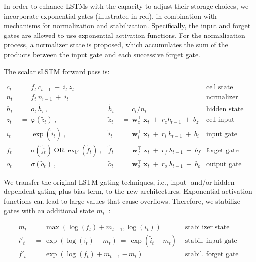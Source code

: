 In order to enhance LSTMs with the capacity to adjust their storage choices, we incorporate exponential gates (illustrated in red), in combination with mechanisms for normalization and stabilization. Specifically, the input and forget gates are allowed to use exponential activation functions. For the normalization process, a normalizer state is proposed, which accumulates the sum of the products between the input gate and each successive forget gate.

The scalar sLSTM forward pass is:

\begin{align}
\label{eq:slstmforward}
c_t \ &= \  f_t \ c_{t-1} \ + \ i_t \ z_t & & 
 &\text{cell state} \\
n_t \ &= \  f_t \ n_{t-1} \ + \ i_t  & & 
 &\text{normalizer state} \\
h_t \ &= \ o_t \ \tilde{h}_t \ ,
  &\tilde{h}_t \ &= \ c_t / n_t
&\text{hidden state} \\
z_t \ &= \ \varphi \left( \tilde{z}_t \right) \ , 
  &\tilde{z}_t \ &=  \ \mathbf{w}^\top_{z} \ \mathbf{x}_t \ + \
  r_{z}  h_{t-1} \ + \  b_{z}
  &\text{cell input} \\
i_t \ &= \ \!\exp \left( \tilde{i}_t  \right) \ , 
  &\tilde{i}_t \ &= \ \mathbf{w}^\top_{i} \ \mathbf{x}_t \ + \
  r_{i}  \ h_{t-1} \ + \  b_{i}
  &\text{input gate} \\
f_t \ &= \ \sigma \left(  \tilde{f}_t \right) \ \text{OR} \
\!\exp \left(  \tilde{f}_t \right) \ ,
  &\tilde{f}_t \ &= \ \mathbf{w}^\top_{f} \ \mathbf{x}_t  \ + \
  r_{f}  \ h_{t-1} \ + \  b_{f}
  &\text{forget gate} \\
o_t \ &= \ \sigma \left( \tilde{o}_t \right) \ , 
  &\tilde{o}_t  \ &= \ \mathbf{w}^\top_{o} \ \mathbf{x}_t \ + \
  r_{o}  \ h_{t-1} \ + \  b_{o}
  &\text{output gate} 
\end{align}

We transfer the original LSTM gating techniques, i.e., input- and/or hidden-dependent gating plus bias term, to the new architectures. Exponential activation functions can lead to large values that cause overflows. Therefore, we stabilize gates with an additional state \mbox{$m_t$~\citep{Milakov:18arxiv}}:

\begin{align}
\label{eq:slstmstabil}
m_t \ &= \ \max \left( \log ( f_t ) + m_{t-1} , \log ( i_t ) \right) &\text{stabilizer state} \\
i'_t \ &= \ \!\exp \left( \log \left ( i_t \right) - m_t \right) \ = \ \!\exp \left( \tilde{i}_t - m_t \right) \ \, 
  &\text{stabil. input gate} \\
f'_t \ &= \ \!\exp \left( \log \left( f_t \right) + m_{t-1} - m_t \right) \ \, 
  &\text{stabil. forget gate}
\end{align}

